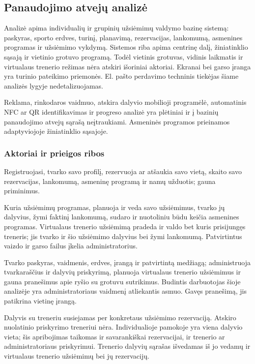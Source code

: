 \subsection{Panaudojimo atvejų analizė}\label{sec:panaudojimo-atvejai}
Analizė apima individualių ir grupinių užsiėmimų valdymo bazinę sistemą: paskyras, sporto erdves, turinį, planavimą, rezervacijas, lankomumą, asmenines programas ir užsiėmimo vykdymą. Sistemos riba apima centrinę dalį, žiniatinklio sąsają ir vietinio grotuvo programą. Todėl vietinis grotuvas, vidinis laikmatis ir virtualaus trenerio režimas nėra atskiri išoriniai aktoriai. Ekranai bei garso įranga yra turinio pateikimo priemonės. El. pašto perdavimo techninis tiekėjas šiame analizės lygyje nedetalizuojamas.

Reklama, rinkodaros vaidmuo, atskira dalyvio mobilioji programėlė, automatinis NFC ar QR identifikavimas ir progreso analizė yra plėtiniai ir į bazinių panaudojimo atvejų sąrašą neįtraukiami. Asmeninės programos prieinamos adaptyviojoje žiniatinklio sąsajoje.

\subsubsection{Aktoriai ir prieigos ribos}
\begin{description}[style=nextline]
\item[Dalyvis] Registruojasi, tvarko savo profilį, rezervuoja ar atšaukia savo vietą, skaito savo rezervacijas, lankomumą, asmeninę programą ir namų užduotis; gauna priminimus.
\item[Treneris] Kuria užsiėmimų programas, planuoja ir veda savo užsiėmimus, tvarko jų dalyvius, žymi faktinį lankomumą, sudaro ir nuotoliniu būdu keičia asmenines programas. Virtualaus trenerio užsiėmimą pradeda ir valdo bet kuris prisijungęs treneris; jis tvarko ir šio užsiėmimo dalyvius bei žymi lankomumą. Patvirtintus vaizdo ir garso failus įkelia administratorius.
\item[Administratorius] Tvarko paskyras, vaidmenis, erdves, įrangą ir patvirtintą medžiagą; administruoja tvarkaraščius ir dalyvių priskyrimą, planuoja virtualaus trenerio užsiėmimus ir gauna pranešimus apie ryšio su grotuvu sutrikimus. Budintis darbuotojas šioje analizėje yra administratoriaus vaidmenį atliekantis asmuo. Gavęs pranešimą, jis patikrina vietinę įrangą.
\end{description}
Dalyvis su treneriu susiejamas per konkretaus užsiėmimo rezervaciją. Atskiro nuolatinio priskyrimo treneriui nėra. Individualioje pamokoje yra viena dalyvio vieta; šis apribojimas taikomas ir savarankiškai rezervacijai, ir trenerio ar administratoriaus priskyrimui. Trenerio dalyvių sąrašas išvedamas iš jo vedamų ir virtualaus trenerio užsiėmimų bei jų rezervacijų.


